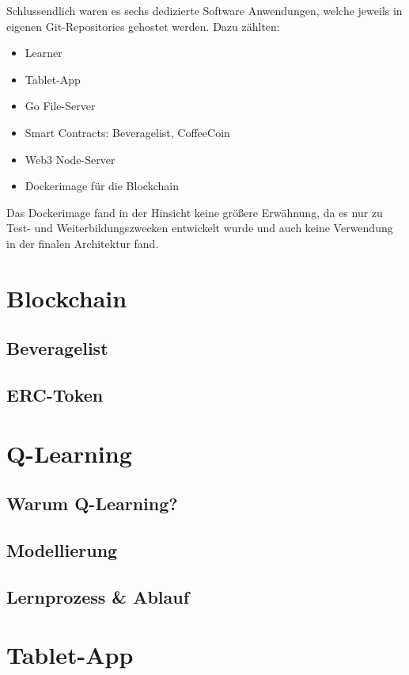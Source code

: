 Schlussendlich waren es sechs dedizierte Software Anwendungen, welche jeweils in eigenen Git-Repositories gehostet werden. 
Dazu zählten:
\begin{itemize}
	\item Learner
	\item Tablet-App
	\item Go File-Server
	\item Smart Contracts: Beveragelist, CoffeeCoin
	\item Web3 Node-Server
	\item Dockerimage für die Blockchain
\end{itemize} 
Das Dockerimage fand in der Hinsicht keine größere Erwähnung, da es nur zu Test- und Weiterbildungszwecken entwickelt wurde und auch keine Verwendung in der finalen Architektur fand.


\section{Blockchain}
\label{sec:bchain}

\subsection{Beveragelist}
\label{subsec:bl}

\subsection{ERC-Token}
\label{subsec:cc}

\section{Q-Learning}
\label{sec:ql}

\subsection{Warum Q-Learning?}
\label{subsec:y-ql}

\subsection{Modellierung}
\label{subsec:modulation}

\subsection{Lernprozess \& Ablauf}
\label{subsec:learning}

\section{Tablet-App}
\label{sec:app}